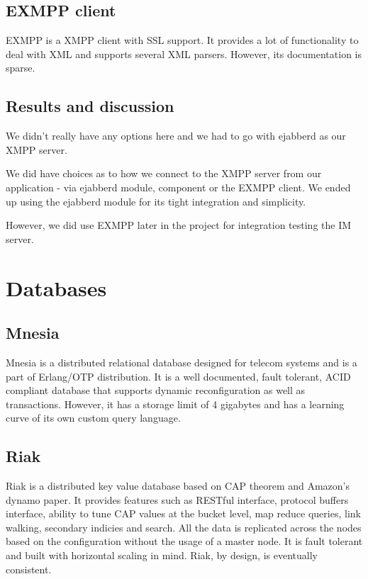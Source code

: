\documentclass[11pt,a4paper]{report}
\begin{document}
\subsection{EXMPP client}
EXMPP is a XMPP client with SSL support. It provides a lot of functionality to deal with XML and supports several XML parsers. However, its documentation is sparse.

\subsection{Results and discussion}
We didn't really have any options here and we had to go with ejabberd as our XMPP server.

We did have choices as to how we connect to the XMPP server from our application - via ejabberd module, component or the EXMPP client. We ended up using the ejabberd module for its tight integration and simplicity.

However, we did use EXMPP later in the project for integration testing the IM server.

\section{Databases}
\subsection{Mnesia}
Mnesia is a distributed relational database designed for telecom systems and is a part of Erlang/OTP distribution. It is a well documented, fault tolerant, ACID\cite{ACID} compliant database that supports dynamic reconfiguration as well as transactions. However, it has a storage limit of 4 gigabytes and has a learning curve of its own custom query language.

\subsection{Riak}
Riak is a distributed key value database based on CAP theorem\cite{cap_theorem} and Amazon's dynamo paper\cite{dynamo}. It provides features such as RESTful interface, protocol buffers interface, ability to tune CAP values at the bucket level, map reduce queries, link walking, secondary indicies and search. All the data is replicated across the nodes based on the configuration without the usage of a master node. It is fault tolerant and built with horizontal scaling in mind. Riak, by design, is eventually consistent.
\end{document}
